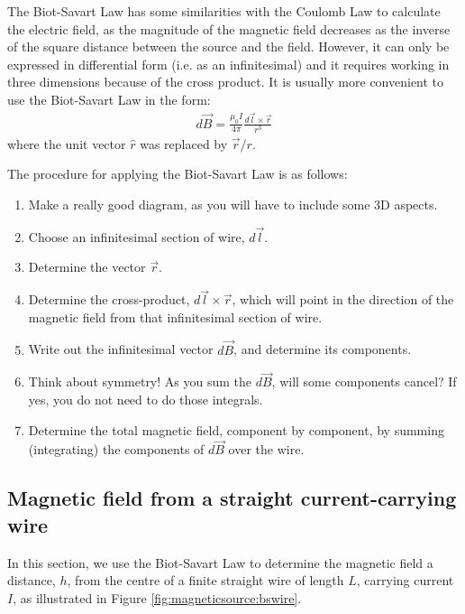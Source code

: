 The Biot-Savart Law has some similarities with the Coulomb Law to calculate the electric field, as the magnitude of the magnetic field decreases as the inverse of the square distance between the source and the field. However, it can only be expressed in differential form (i.e. as an infinitesimal) and it requires working in three dimensions because of the cross product. It is usually more convenient to use the Biot-Savart Law in the form:
\begin{align*}
d\vec B = \frac{\mu_0 I}{4\pi}\frac{d\vec l\times \vec r}{r^3}
\end{align*}
where the unit vector $\hat r$ was replaced by $\vec r/r$.

The procedure for applying the Biot-Savart Law is as follows:
\begin{enumerate}
\item Make a really good diagram, as you will have to include some 3D aspects.
\item Choose an infinitesimal section of wire, $d\vec l$.
\item Determine the vector $\vec r$.
\item Determine the cross-product, $d\vec l \times \vec r$, which will point in the direction of the magnetic field from that infinitesimal section of wire.
\item Write out the infinitesimal vector $d\vec B$, and determine its components.
\item Think about symmetry! As you sum the $d\vec B$, will some components cancel? If yes, you do not need to do those integrals.
\item Determine the total magnetic field, component by component, by summing (integrating) the components of $d\vec B$ over the wire.
\end{enumerate}

\subsection{Magnetic field from a straight current-carrying wire}
In this section, we use the Biot-Savart Law to determine the magnetic field a distance, $h$, from the centre of a finite straight wire of length $L$, carrying current $I$, as illustrated in Figure \ref{fig:magneticsource:bswire}.

